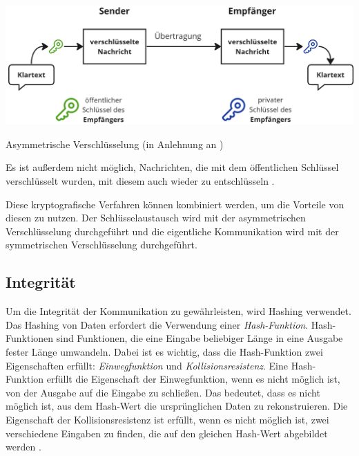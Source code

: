 \begin{center}
    \captionsetup{type=figure}
    \includegraphics[width=1\linewidth]{images/asymmetric_encryption.png}
    \caption{Asymmetrische Verschlüsselung (in Anlehnung an \cite{ElektronikKompendium_asymmetrischeVerschluesselung})}
    \label{fig:asymmetrische_verschluesselung}
\end{center}

\noindent Es ist außerdem nicht möglich, Nachrichten, die mit dem öffentlichen Schlüssel verschlüsselt wurden, mit diesem auch wieder zu entschlüsseln \parencite{ElektronikKompendium_asymmetrischeVerschluesselung}. 

Diese kryptografische Verfahren können kombiniert werden, um die Vorteile von diesen zu nutzen. Der Schlüsselaustausch wird mit der asymmetrischen Verschlüsselung durchgeführt und die eigentliche Kommunikation wird mit der symmetrischen Verschlüsselung durchgeführt.


\subsection{Integrität}
\label{subsec:integritaet_signatur}

Um die Integrität der Kommunikation zu gewährleisten, wird Hashing verwendet. Das Hashing von Daten erfordert die Verwendung einer \textit{Hash-Funktion}. Hash-Funktionen sind Funktionen, die eine Eingabe beliebiger Länge in eine Ausgabe fester Länge umwandeln. Dabei ist es wichtig, dass die Hash-Funktion zwei Eigenschaften erfüllt: \textit{Einwegfunktion} und \textit{Kollisionsresistenz}. Eine Hash-Funktion erfüllt die Eigenschaft der Einwegfunktion, wenn es nicht möglich ist, von der Ausgabe auf die Eingabe zu schließen. Das bedeutet, dass es nicht möglich ist, aus dem Hash-Wert die ursprünglichen Daten zu rekonstruieren. Die Eigenschaft der Kollisionsresistenz ist erfüllt, wenn es nicht möglich ist, zwei verschiedene Eingaben zu finden, die auf den gleichen Hash-Wert abgebildet werden \parencites[S. 12-13]{Brünnler_BlockchainKurzGut}[S. 6]{Fill_BlockchainGrundlagen}.

